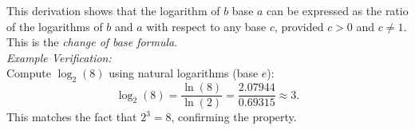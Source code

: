\documentclass[a4paper,10pt]{article}
\begin{document}
This derivation shows that the logarithm of \(b\) base \(a\) can be expressed as the ratio of the logarithms of \(b\) and \(a\) with respect to any base \(c\), provided \(c > 0\) and \(c \neq 1\). This is the \emph{change of base formula}.\\

\emph{Example Verification:}\\
Compute \(\log_2(8)\) using natural logarithms (base \(e\)):
\[
\log_2(8) = \frac{\ln(8)}{\ln(2)} = \frac{2.07944}{0.69315} \approx 3.
\]
This matches the fact that \(2^3 = 8\), confirming the property.
\end{document}

